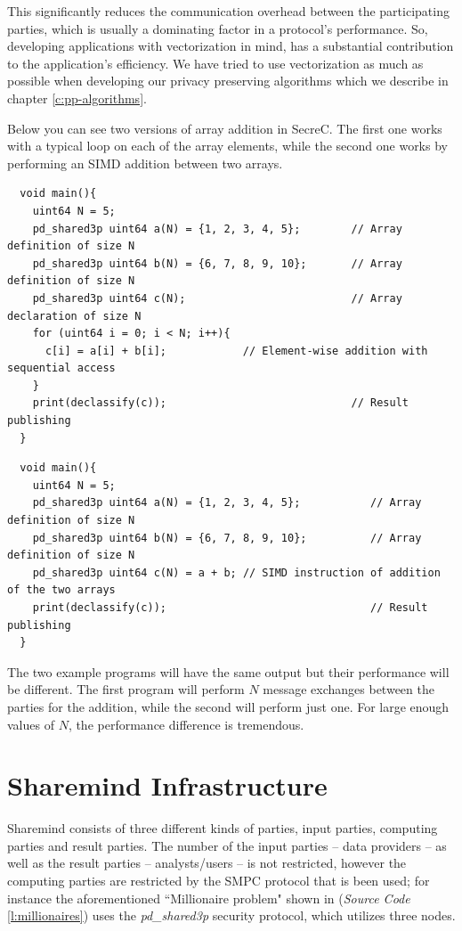 This significantly reduces the communication overhead between the participating parties, which is usually a dominating factor in a protocol's performance.
So, developing applications with vectorization in mind, has a substantial contribution to the application's efficiency.
We have tried to use vectorization as much as possible when developing our privacy preserving algorithms which we describe in chapter \ref{c:pp-algorithms}.

Below you can see two versions of array addition in SecreC.
The first one works with a typical loop on each of the array elements, while the second one works by performing an SIMD addition between two arrays.

{
\begin{verbatim}
  void main(){
    uint64 N = 5;
    pd_shared3p uint64 a(N) = {1, 2, 3, 4, 5};        // Array definition of size N
    pd_shared3p uint64 b(N) = {6, 7, 8, 9, 10};       // Array definition of size N
    pd_shared3p uint64 c(N);                          // Array declaration of size N
    for (uint64 i = 0; i < N; i++){
      c[i] = a[i] + b[i];            // Element-wise addition with sequential access
    }
    print(declassify(c));                             // Result publishing
  }
\end{verbatim}
\label{l:non_vectorized_addition}
}

{
\begin{verbatim}
  void main(){
    uint64 N = 5;
    pd_shared3p uint64 a(N) = {1, 2, 3, 4, 5};           // Array definition of size N
    pd_shared3p uint64 b(N) = {6, 7, 8, 9, 10};          // Array definition of size N
    pd_shared3p uint64 c(N) = a + b; // SIMD instruction of addition of the two arrays
    print(declassify(c));                                // Result publishing
  }
\end{verbatim}
\label{l:vectorized_addition}
}

The two example programs will have the same output but their performance will be different. The first program will perform $N$ message exchanges between the parties for the addition, while the second will perform just one.
For large enough values of $N$, the performance difference is tremendous.

\section{Sharemind Infrastructure}\label{sharemind-infrastructure}
Sharemind consists of three different kinds of parties, input parties, computing parties and result parties.
The number of the input parties -- data providers -- as well as the result parties -- analysts/users -- is not restricted, however the computing parties are restricted by the SMPC protocol that is been used; for instance the aforementioned ``Millionaire problem" shown in (\textit{Source Code} \ref{l:millionaires}) uses the \textit{pd\_shared3p} security protocol, which utilizes three nodes.

